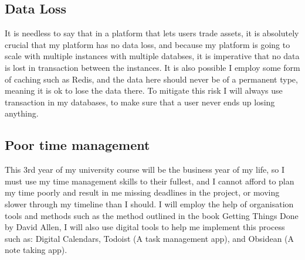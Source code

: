 \documentclass[titlepage]{article}
\begin{document}
\subsection{Data Loss}
It is needless to say that in a platform that lets users trade assets, it is absolutely crucial that my platform has no data loss, and because my platform is going to scale with multiple instances with multiple databses, it is imperative that no data is lost in transaction between the instances. It is also possible I employ some form of caching such as Redis, and the data here should never be of a permanent type, meaning it is ok to lose the data there. To mitigate this risk I will always use transaction in my databases, to make sure that a user never ends up losing anything.

\subsection{Poor time management}
This 3rd year of my university course will be the business year of my life, so I must use my time management skills to their fullest, and I cannot afford to plan my time poorly and result in me missing deadlines in the project, or moving slower through my timeline than I should. I will employ the help of organisation tools and methods such as the method outlined in the book Getting Things Done by David Allen, I will also use digital tools to help me implement this process such as: Digital Calendars, Todoist (A task management app), and Obsidean (A note taking app).

 

\end{document}
